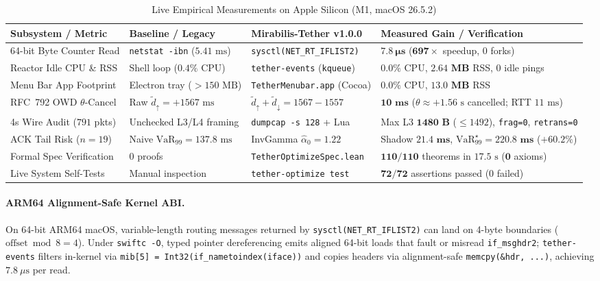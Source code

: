 \documentclass[11pt,a4paper]{article}
\theoremstyle{definition}
\begin{document}
\begin{table}[htbp]
\centering
\caption{Live Empirical Measurements on Apple Silicon (M1, macOS 26.5.2)}
\label{tab:empirical}
\vspace{4pt}
\small
\begin{tabular}{@{}llll@{}}
\toprule
\textbf{Subsystem / Metric} & \textbf{Baseline / Legacy} & \textbf{Mirabilis-Tether v1.0.0} & \textbf{Measured Gain / Verification} \\
\midrule
64-bit Byte Counter Read & \texttt{netstat -ibn} ($5.41\text{ ms}$) & \texttt{sysctl(NET\_RT\_IFLIST2)} & $\mathbf{7.8~\mu\text{s}}$ ($\mathbf{697\times}$ speedup, $0$ forks) \\
Reactor Idle CPU \& RSS & Shell loop ($0.4\%$ CPU) & \texttt{tether-events} (\texttt{kqueue}) & $\mathbf{0.0\%}$ CPU, $\mathbf{2.64\text{ MB}}$ RSS, $0$ idle pings \\
Menu Bar App Footprint & Electron tray ($>150\text{ MB}$) & \texttt{TetherMenubar.app} (Cocoa) & $\mathbf{0.0\%}$ CPU, $\mathbf{13.0\text{ MB}}$ RSS \\
RFC~792 OWD $\theta$-Cancel & Raw $\tilde{d}_\uparrow = +1567\text{ ms}$ & $\tilde{d}_\uparrow + \tilde{d}_\downarrow = 1567 - 1557$ & $\mathbf{10\text{ ms}}$ ($\theta \approx +1.56\text{ s}$ cancelled; RTT $11\text{ ms}$) \\
4s Wire Audit ($791$ pkts) & Unchecked L3/L4 framing & \texttt{dumpcap -s 128} + Lua & Max L3 $\mathbf{1480\text{ B}}$ ($\le 1492$), \texttt{frag=0}, \texttt{retrans=0} \\
ACK Tail Risk ($n=19$) & Naive $\mathrm{VaR}_{99} = 137.8\text{ ms}$ & InvGamma $\widehat{\alpha}_0 = 1.22$ & Shadow $\mathbf{21.4\text{ ms}}$, $\mathrm{VaR}_{99}^\star = \mathbf{220.8\text{ ms}}$ ($+60.2\%$) \\
Formal Spec Verification & $0$ proofs & \texttt{TetherOptimizeSpec.lean} & $\mathbf{110 / 110}$ theorems in $17.5\text{ s}$ ($\mathbf{0}$ axioms) \\
Live System Self-Tests & Manual inspection & \texttt{tether-optimize test} & $\mathbf{72 / 72}$ assertions passed ($0$ failed) \\
\bottomrule
\end{tabular}
\end{table}

\paragraph{ARM64 Alignment-Safe Kernel ABI.} On 64-bit ARM64 macOS, variable-length routing messages returned by \texttt{sysctl(NET\_RT\_IFLIST2)} can land on 4-byte boundaries ($\text{offset} \bmod 8 = 4$). Under \texttt{swiftc -O}, typed pointer dereferencing emits aligned 64-bit loads that fault or misread \texttt{if\_msghdr2}; \texttt{tether-events} filters in-kernel via \texttt{mib[5] = Int32(if\_nametoindex(iface))} and copies headers via alignment-safe \texttt{memcpy(\&hdr, ...)}, achieving $7.8~\mu\text{s}$ per read.
\end{document}
